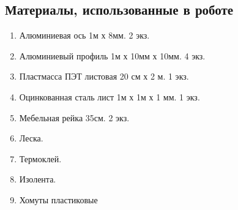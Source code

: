 \subsection{Материалы, использованные в роботе}

\begin{enumerate}
	\item Алюминиевая ось 1м х 8мм. 2 экз.
	\item Алюминиевый профиль 1м х 10мм х 10мм. 4 экз.
	\item Пластмасса ПЭТ листовая 20 см х 2 м. 1 экз.
	\item Оцинкованная сталь лист 1м х 1м х 1 мм. 1 экз.
	\item Мебельная рейка 35см. 2 экз.
	\item Леска.
	\item Термоклей.
	\item Изолента.
	\item Хомуты пластиковые
\end{enumerate}
\fillpage
\newpage